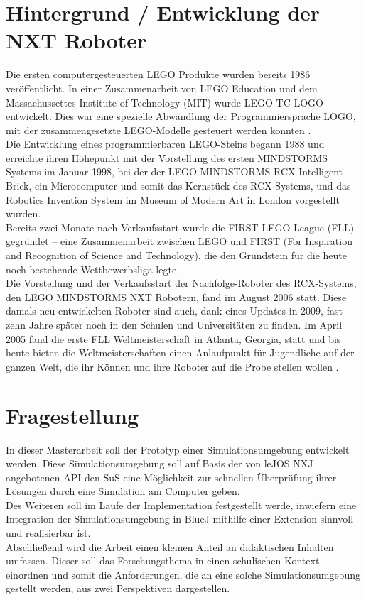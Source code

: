 \documentclass[paper=a4, pagesize, DIV=calc, BCOR=12.5mm, twoside=on, onecolumn=on, open = any, titlepage =on, parskip =half-, headsepline = on, footsepline = on, chapterprefix = on, appendixprefix = off, fontsize = 12pt, numbers = noenddot, abstract = on]{scrbook}
\numberwithin{equation}{chapter}
\begin{document}
\par \singlespacing
\section*{Hintergrund / Entwicklung der NXT Roboter}
\onehalfspacing
Die ersten computergesteuerten LEGO Produkte wurden bereits 1986 veröffentlicht. In einer Zusammenarbeit von LEGO Education und dem Massachussettes Institute of Technology (MIT) wurde LEGO TC LOGO entwickelt. Dies war eine spezielle Abwandlung der Programmiersprache LOGO, mit der zusammengesetzte LEGO-Modelle gesteuert werden konnten \cite{rolling:14}.\\
Die Entwicklung eines programmierbaren LEGO-Steins begann 1988 und erreichte ihren Höhepunkt mit der Vorstellung des ersten MINDSTORMS Systems im Januar 1998, bei der der LEGO MINDSTORMS RCX Intelligent Brick, ein Microcomputer und somit das Kernstück des RCX-Systems, und das Robotics Invention System im Museum of Modern Art in London vorgestellt wurden.\\
Bereits zwei Monate nach Verkaufsstart wurde die FIRST LEGO League (FLL) gegründet -- eine Zusammenarbeit zwischen LEGO und FIRST (For Inspiration and Recognition of Science and Technology), die den Grundstein für die heute noch bestehende Wettbewerbsliga legte \cite{rolling:14}.\\
Die Vorstellung und der Verkaufsstart der Nachfolge-Roboter des RCX-Systems, den LEGO MINDSTORMS NXT Robotern, fand im August 2006 statt. Diese damals neu entwickelten Roboter sind auch, dank eines Updates in 2009, fast zehn Jahre später noch in den Schulen und Universitäten zu finden. Im April 2005 fand die erste FLL Weltmeisterschaft in Atlanta, Georgia, statt und bis heute bieten die Weltmeisterschaften einen Anlaufpunkt für Jugendliche auf der ganzen Welt, die ihr Können und ihre Roboter auf die Probe stellen wollen \cite{lego}.

\par \singlespacing
\section*{Fragestellung}
\onehalfspacing
In dieser Masterarbeit soll der Prototyp einer Simulationsumgebung entwickelt werden. Diese Simulationsumgebung soll auf Basis der von leJOS NXJ angebotenen API den SuS eine Möglichkeit zur schnellen Überprüfung ihrer Lösungen durch eine Simulation am Computer geben.\\
Des Weiteren soll im Laufe der Implementation festgestellt werde, inwiefern eine Integration der Simulationsumgebung in BlueJ mithilfe einer Extension sinnvoll und realisierbar ist.\\
Abschließend wird die Arbeit einen kleinen Anteil an didaktischen Inhalten umfassen. Dieser soll das Forschungsthema in einen schulischen Kontext einordnen und somit die Anforderungen, die an eine solche Simulationsumgebung gestellt werden, aus zwei Perspektiven dargestellen.
\end{document}
